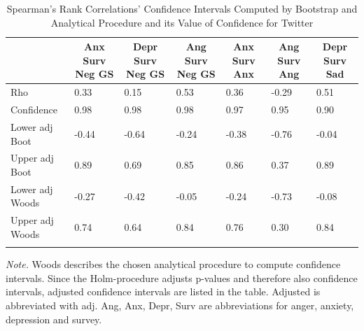 \documentclass[
  english,
  jou,floatsintext]{apa7}
\begin{document}
\begin{table}[tbp]

\begin{center}
\begin{threeparttable}

\caption{\label{tab:table-appendix-1}Spearman's Rank Correlations' Confidence Intervals Computed by Bootstrap and Analytical Procedure and its Value of Confidence for Twitter}

\small{

\begin{tabular}{lllllll}
\toprule
 & \multicolumn{1}{c}{Anx Surv Neg GS} & \multicolumn{1}{c}{Depr Surv Neg GS} & \multicolumn{1}{c}{Ang Surv Neg GS} & \multicolumn{1}{c}{Anx Surv Anx} & \multicolumn{1}{c}{Ang Surv Ang} & \multicolumn{1}{c}{Depr Surv Sad}\\
\midrule
Rho & 0.33 & 0.15 & 0.53 & 0.36 & -0.29 & 0.51\\
Confidence & 0.98 & 0.98 & 0.98 & 0.97 & 0.95 & 0.90\\
Lower adj Boot & -0.44 & -0.64 & -0.24 & -0.38 & -0.76 & -0.04\\
Upper adj Boot & 0.89 & 0.69 & 0.85 & 0.86 & 0.37 & 0.89\\
Lower adj Woods & -0.27 & -0.42 & -0.05 & -0.24 & -0.73 & -0.08\\
Upper adj Woods & 0.74 & 0.64 & 0.84 & 0.76 & 0.30 & 0.84\\
\bottomrule
\addlinespace
\end{tabular}

}

\begin{tablenotes}[para]
\normalsize{\textit{Note.} Woods describes the chosen analytical procedure to compute confidence intervals. Since the Holm-procedure adjusts p-values and therefore also confidence intervals, adjusted confidence intervals are listed in the table. Adjusted is abbreviated with adj. Ang, Anx, Depr, Surv are abbreviations for anger, anxiety, depression and survey.}
\end{tablenotes}

\end{threeparttable}
\end{center}

\end{table}
\end{document}
